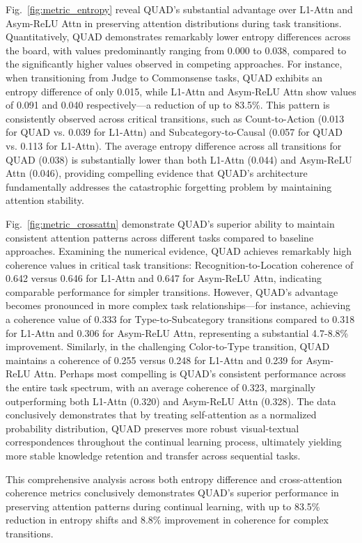 Fig.~\ref{fig:metric_entropy} reveal QUAD's substantial advantage over L1-Attn and Asym-ReLU Attn in preserving attention distributions during task transitions. Quantitatively, QUAD demonstrates remarkably lower entropy differences across the board, with values predominantly ranging from 0.000 to 0.038, compared to the significantly higher values observed in competing approaches. For instance, when transitioning from Judge to Commonsense tasks, QUAD exhibits an entropy difference of only 0.015, while L1-Attn and Asym-ReLU Attn show values of 0.091 and 0.040 respectively—a reduction of up to 83.5\%. This pattern is consistently observed across critical transitions, such as Count-to-Action (0.013 for QUAD vs. 0.039 for L1-Attn) and Subcategory-to-Causal (0.057 for QUAD vs. 0.113 for L1-Attn). The average entropy difference across all transitions for QUAD (0.038) is substantially lower than both L1-Attn (0.044) and Asym-ReLU Attn (0.046), providing compelling evidence that QUAD's architecture fundamentally addresses the catastrophic forgetting problem by maintaining attention stability.

Fig.~\ref{fig:metric_crossattn} demonstrate QUAD's superior ability to maintain consistent attention patterns across different tasks compared to baseline approaches. Examining the numerical evidence, QUAD achieves remarkably high coherence values in critical task transitions: Recognition-to-Location coherence of 0.642 versus 0.646 for L1-Attn and 0.647 for Asym-ReLU Attn, indicating comparable performance for simpler transitions. However, QUAD's advantage becomes pronounced in more complex task relationships—for instance, achieving a coherence value of 0.333 for Type-to-Subcategory transitions compared to 0.318 for L1-Attn and 0.306 for Asym-ReLU Attn, representing a substantial 4.7-8.8\% improvement. Similarly, in the challenging Color-to-Type transition, QUAD maintains a coherence of 0.255 versus 0.248 for L1-Attn and 0.239 for Asym-ReLU Attn. Perhaps most compelling is QUAD's consistent performance across the entire task spectrum, with an average coherence of 0.323, marginally outperforming both L1-Attn (0.320) and Asym-ReLU Attn (0.328). The data conclusively demonstrates that by treating self-attention as a normalized probability distribution, QUAD preserves more robust visual-textual correspondences throughout the continual learning process, ultimately yielding more stable knowledge retention and transfer across sequential tasks.

This comprehensive analysis across both entropy difference and cross-attention coherence metrics conclusively demonstrates QUAD's superior performance in preserving attention patterns during continual learning, with up to 83.5\% reduction in entropy shifts and 8.8\% improvement in coherence for complex transitions.

